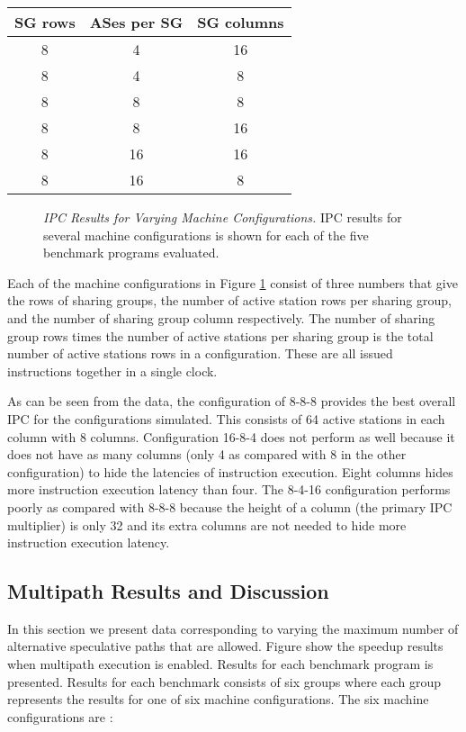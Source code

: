 \documentclass[10pt,dvips]{article}
\begin{document}
\begin{tabular}{|c|c|c|}
\hline 
SG rows&
ASes per SG&
SG columns\\
\hline
\hline 
8&
4&
16\\
\hline 
8&
4&
8\\
\hline 
8&
8&
8\\
\hline 
8&
8&
16\\
\hline 
8&
16&
16\\
\hline 
8&
16&
8\\
\hline
\end{tabular}

\begin{figure}
\vspace{0.2 in}
\setlength{\epsfxsize}{10cm}%
\centerline{}
\caption{{\em IPC Results for Varying Machine Configurations.} 
IPC results for several machine configurations is shown for each of
the five benchmark programs evaluated.}
\label{fig:ipc}
\end{figure}

Each of the machine configurations in Figure \ref{fig:ipc} consist of
three numbers that give the rows of sharing groups, the number of
active station rows per sharing group, and the number of sharing group
column respectively.  The number of sharing group rows times the number
of active stations per sharing group is the total number of active
stations rows in a configuration.  These are all issued instructions
together in a single clock.

As can be seen from the data, the configuration of 8-8-8 provides
the best overall IPC for the configurations simulated.  This consists
of 64 active stations in each column with 8 columns.
Configuration 16-8-4 does not perform as well because it does not
have as many columns (only 4 as compared with 8 in the other configuration)
to hide the latencies of instruction execution.  Eight columns 
hides more instruction execution latency than four.  The 8-4-16
configuration performs poorly as compared with 8-8-8 because the height
of a column (the primary IPC multiplier) is only 32 and its extra
columns are not needed to hide more instruction execution latency.
%
\subsection{Multipath Results and Discussion}
%
In this section we present data corresponding to varying the
maximum number of alternative speculative paths that are allowed.
Figure show the speedup results
when multipath execution is enabled.  Results for
each benchmark program is presented.  Results for each benchmark 
consists of six groups where each group represents the results
for one of six machine configurations.
The six machine configurations are :
\end{document}
